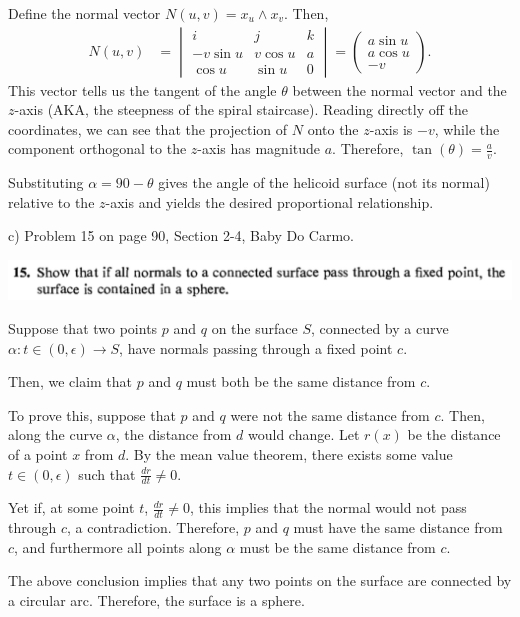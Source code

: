 \documentclass[10pt,letterpaper]{hmcpset}
\begin{document}
\begin{solution}
Define the normal vector $N(u,v) = x_u \wedge x_v$. Then,
\begin{align*}
    N(u,v) &= 
\begin{vmatrix}
i &j &k\\
-v\sin u & v\cos u & a\\
\cos u & \sin u & 0
\end{vmatrix} =
\begin{pmatrix}
a \sin u\\
a \cos u\\
-v
\end{pmatrix}.
\end{align*}
This vector tells us the tangent of the angle $\theta$ between the normal vector and the $z$-axis (AKA, the steepness of the spiral staircase). Reading directly off the coordinates, we can see that the projection of $N$ onto the $z$-axis is $-v$, while the component orthogonal to the $z$-axis has magnitude $a$. Therefore, $\tan(\theta) = \frac{a}{v}$. 

Substituting $\alpha = 90 - \theta$ gives the angle of the helicoid surface (not its normal) relative to the $z$-axis and yields the desired proportional relationship.
\end{solution}
\newpage
\begin{problem}
c) Problem 15 on page 90, Section 2-4, Baby Do Carmo.

\includegraphics[scale=0.7]{Cc.png}
\end{problem}
\begin{solution}
Suppose that two points $p$ and $q$ on the surface $S$, connected by a curve $\alpha \colon t \in (0, \epsilon) \to S$, have normals passing through a fixed point $c$. 

Then, we claim that $p$ and $q$ must both be the same distance from $c$.

To prove this, suppose that $p$ and $q$ were not the same distance from $c$. Then, along the curve $\alpha$, the distance from $d$ would change. Let $r(x)$ be the distance of a point $x$ from $d$. By the mean value theorem, there exists some value $t \in (0, \epsilon)$ such that $\frac{dr}{dt} \neq 0$.

Yet if, at some point $t$, $\frac{dr}{dt} \neq 0$, this implies that the normal would not pass through $c$, a contradiction. Therefore, $p$ and $q$ must have the same distance from $c$, and furthermore all points along $\alpha$ must be the same distance from $c$.

The above conclusion implies that any two points on the surface are connected by a circular arc. Therefore, the surface is a sphere.
\end{solution}
\end{document}
